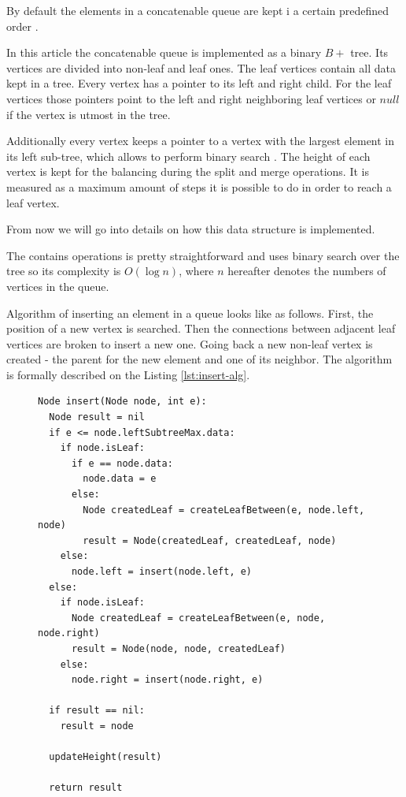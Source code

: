\documentclass[twoside,twocolumn,10pt]{article}
\begin{document}
		By default the elements in a concatenable queue are kept i a certain predefined order \cite[pp..~155-157]{aho}.

		In this article the concatenable queue is implemented as a binary  $B+$ tree. Its vertices are divided into non-leaf and leaf ones. The leaf vertices contain all data kept in a tree. Every vertex has a pointer to its left and right child. For the leaf vertices those pointers point to the left and right neighboring leaf vertices or $null$ if the vertex is utmost in the tree. 

		Additionally every vertex keeps a pointer to a vertex with the largest element in its left sub-tree, which  allows to perform binary search \cite[pp..~155-157]{aho}. The height of each vertex is kept for the balancing during the split and merge operations. It is measured as a maximum amount of steps it is possible to do in order to reach a leaf vertex.

		From now we will go into details on how this data structure is implemented. 

		The contains operations is pretty straightforward and uses binary search over the tree so its complexity is $O(\log n)$, where $n$ hereafter denotes the numbers of vertices in the queue.

		Algorithm of inserting an element in a queue looks like as follows. First, the position of a new vertex is searched. Then the connections between adjacent leaf vertices are broken to insert a new one. Going back a new non-leaf vertex is created - the parent for the new element and one of its neighbor. The algorithm is formally described on the Listing \ref{lst:insert-alg}.

		\begin{figure}[htbp]
			\begin{lstlisting}[caption={Queue insertion algorithm},label={lst:insert-alg},captionpos=b]
Node insert(Node node, int e):
  Node result = nil
  if e <= node.leftSubtreeMax.data:
  	if node.isLeaf:
  	  if e == node.data:
        node.data = e
  	  else:
        Node createdLeaf = createLeafBetween(e, node.left, node)
        result = Node(createdLeaf, createdLeaf, node)
    else:
      node.left = insert(node.left, e)
  else:
    if node.isLeaf:
      Node createdLeaf = createLeafBetween(e, node, node.right)
      result = Node(node, node, createdLeaf)
    else:
      node.right = insert(node.right, e)

  if result == nil:
  	result = node

  updateHeight(result)

  return result
			\end{lstlisting}
		\end{figure}
\end{document}
